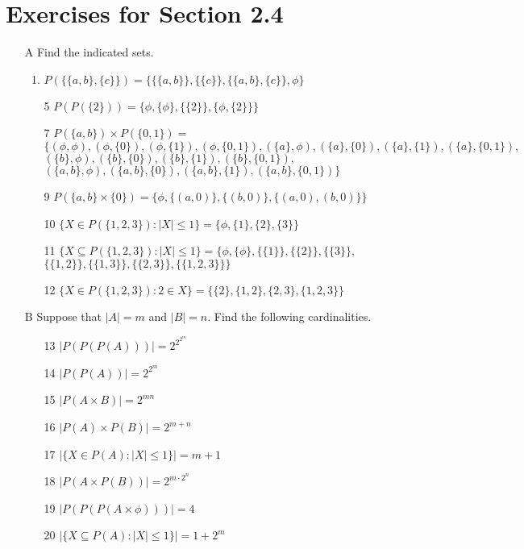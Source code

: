 \documentclass[12pt]{article}
\begin{document}
\section*{Exercises for Section 2.4}
\begin{itemize}
	\item [A] Find the indicated sets.
	    \begin{enumerate}
		\item $P(\{\{a,b\}, \{c\}\}) = \{\{\{a,b\}\}, \{\{c\}\}, \{\{a,b\}, \{c\}\}, \phi\}$
		\item [5] $P(P(\{2\})) = \{\phi, \{\phi\}, \{\{2\}\}, \{\phi, \{2\}\}\}$
		\item [7] $P(\{a,b\})\times P(\{0, 1\}) =$\\
		    $\{(\phi, \phi), (\phi, \{0\}), (\phi, \{1\}), (\phi, \{0,1\}), (\{a\}, \phi), (\{a\}, \{0\}), (\{a\}, \{1\}), (\{a\}, \{0,1\}),$\\
		    $(\{b\}, \phi), (\{b\}, \{0\}), (\{b\}, \{1\}), (\{b\}, \{0,1\}),$\\
		    $(\{a,b\}, \phi), (\{a,b\}, \{0\}), (\{a,b\}, \{1\}), (\{a,b\}, \{0,1\})\}$
		\item [9] $P(\{a,b\}\times\{0\}) = \{\phi, \{(a,0)\}, \{(b,0)\}, \{(a,0), (b,0)\}\}$
		\item [10] $\{X \in P(\{1,2,3\}): |X| \le 1\} = \{\phi, \{1\}, \{2\}, \{3\}\}$
		\item [11] $\{X \subseteq P(\{1,2,3\}): |X| \le 1\} = \{\phi, \{\phi\}, \{\{1\}\}, \{\{2\}\}, \{\{3\}\},$\\
		    $\{\{1,2\}\}, \{\{1,3\}\},\{\{2,3\}\}, \{\{1,2,3\}\}\}$
		\item [12] $\{X \in P(\{1,2,3\}): 2\in X\} = \{\{2\}, \{1,2\}, \{2,3\},\{1,2,3\}\}$
	    \end{enumerate}
	\item [B] Suppose that $|A|=m$ and $|B|=n $. Find the following cardinalities.
	    \begin{itemize}
		\item [13] $|P(P(P(A)))| = 2^{2^{2^m}}$
		\item [14] $|P(P(A))| = 2^{2^m}$
		\item [15] $|P(A\times B)| = 2^{mn}$
		\item [16] $|P(A)\times P(B)| = 2^{m+n}$
		\item [17] $|\{X \in P(A): |X| \le 1\}| = m+1$
		\item [18] $|P(A\times P(B))| = 2^{m\cdot 2^n}$
		\item [19] $|P(P(P(A\times \phi)))| = 4$ 
		\item [20] $|\{X \subseteq P(A): |X| \le 1\}| = 1+2^m$
	    \end{itemize}
\end{itemize}
\end{document}
